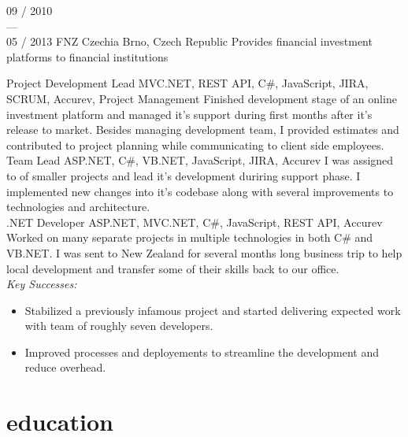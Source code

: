 \documentclass[]{friggeri-cv} %
\begin{document}
\begin{entrylist}
  \job
  {09 / 2010 \\ --- \\ 05 / 2013}
  {FNZ Czechia}
  {Brno, Czech Republic}
  {Provides financial investment platforms to financial institutions}
  {
    \position
    {Project Development Lead}
    {MVC.NET, REST API, C\#, JavaScript, JIRA, SCRUM, Accurev, Project Management}
    {Finished development stage of an online investment platform and managed it's support during first months after it's
    release to market. Besides managing development team, I provided estimates and contributed to project planning
    while communicating to client side employees.}\\
    \position
    {Team Lead}
    {ASP.NET, C\#, VB.NET, JavaScript, JIRA, Accurev}
    {I was assigned to of smaller projects and lead it's development duriring support phase. I implemented new changes
    into it's codebase along with several improvements to technologies and architecture.}\\
    \position
    {.NET Developer}
    {ASP.NET, MVC.NET, C\#, JavaScript, REST API, Accurev}
    {Worked on many separate projects in multiple technologies in both C\# and VB.NET. I was sent to New Zealand for
    several months long business trip to help local development and transfer some of their skills back to our office.}\\
    \emph{Key Successes:}
    \begin{itemize}
      \item Stabilized a previously infamous project and started delivering expected work with team of roughly seven developers.
      \item Improved processes and deployements to streamline the development and reduce overhead.
    \end{itemize}\medskip
  }
\end{entrylist}

\section{education}
\end{document}
